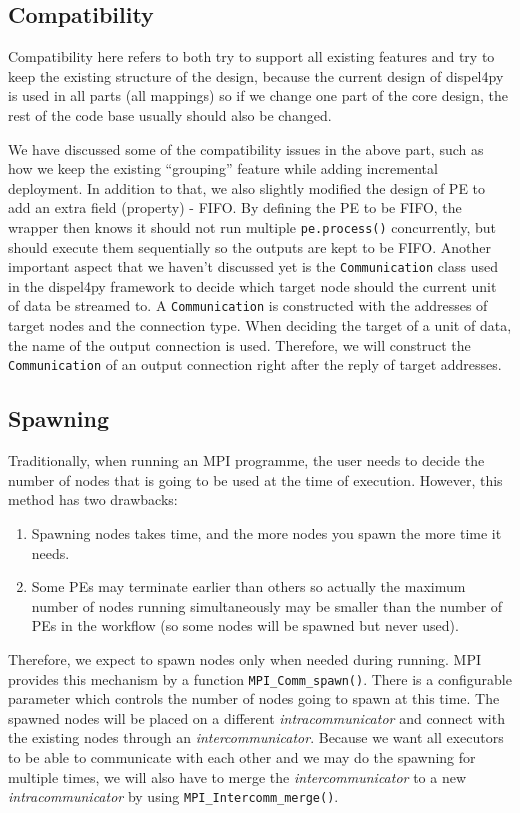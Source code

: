 \subsection{Compatibility}
Compatibility here refers to both try to support all existing features and try to keep the existing structure of the design, because the current design of dispel4py is used in all parts (all mappings) so if we change one part of the core design, the rest of the code base usually should also be changed.

We have discussed some of the compatibility issues in the above part, such as how we keep the existing ``grouping'' feature while adding incremental deployment. In addition to that, we also slightly modified the design of PE to add an extra field (property) - FIFO. By defining the PE to be FIFO, the wrapper then knows it should not run multiple \lstinline|pe.process()| concurrently, but should execute them sequentially so the outputs are kept to be FIFO. Another important aspect that we haven't discussed yet is the \lstinline|Communication| class used in the dispel4py framework to decide which  target node should the current unit of data be streamed to. A \lstinline|Communication| is constructed with the addresses of target nodes and the connection type. When deciding the target of a unit of data, the name of the output connection is used. Therefore, we will construct the \lstinline|Communication| of an output connection right after the reply of target addresses.

\subsection{Spawning}
Traditionally, when running an MPI programme, the user needs to decide the number of nodes that is going to be used at the time of execution. However, this method has two drawbacks:
\begin{enumerate}
	\item Spawning nodes takes time, and the more nodes you spawn the more time it needs.
	\item Some PEs may terminate earlier than others so actually the maximum number of nodes running simultaneously may be smaller than the number of PEs in the workflow (so some nodes will be spawned but never used).
\end{enumerate}

Therefore, we expect to spawn nodes only when needed during running. MPI provides this mechanism by a function \lstinline|MPI_Comm_spawn()|. There is a configurable parameter which controls the number of nodes going to spawn at this time. The spawned nodes will be placed on a different \textit{intracommunicator} and connect with the existing nodes through an \textit{intercommunicator}. Because we want all executors to be able to communicate with each other and we may do the spawning for multiple times, we will also have to merge the \textit{intercommunicator} to a new \textit{intracommunicator} by using \lstinline|MPI_Intercomm_merge()|.

